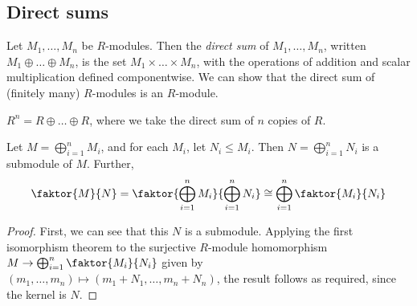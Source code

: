 \subsection{Direct sums}
\begin{definition}
	Let $M_1, \dots, M_n$ be $R$-modules.
	Then the \textit{direct sum} of $M_1, \dots, M_n$, written $M_1 \oplus \dots \oplus M_n$, is the set $M_1 \times \dots \times M_n$, with the operations of addition and scalar multiplication defined componentwise.
	We can show that the direct sum of (finitely many) $R$-modules is an $R$-module.
\end{definition}
\begin{example}
	$R^n = R \oplus \dots \oplus R$, where we take the direct sum of $n$ copies of $R$.
\end{example}
\begin{lemma}
	Let $M = \bigoplus_{i=1}^n M_i$, and for each $M_i$, let $N_i \leq M_i$.
	Then $N = \bigoplus_{i=1}^n N_i$ is a submodule of $M$.
	Further,
	\begin{align*}
		\faktor{M}{N} = \faktor{\bigoplus_{i=1}^n M_i}{\bigoplus_{i=1}^n N_i} \cong \bigoplus_{i=1}^n \faktor{M_i}{N_i}
	\end{align*}
\end{lemma}
\begin{proof}
	First, we can see that this $N$ is a submodule.
	Applying the first isomorphism theorem to the surjective $R$-module homomorphism $M \to \bigoplus_{i=1}^n \faktor{M_i}{N_i}$ given by $(m_1, \dots, m_n) \mapsto (m_1 + N_1, \dots, m_n + N_n)$, the result follows as required, since the kernel is $N$.
\end{proof}

